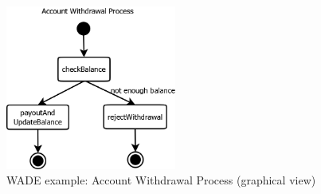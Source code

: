 \begin{figure}[h]
		\centering
		\includegraphics[width=0.5\textwidth]{images/wade_example.png}
		\caption{WADE example: Account Withdrawal Process (graphical view)}
	  \label{fig:wade_graph}
\end{figure}
\newpage
